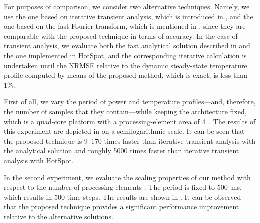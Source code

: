 For purposes of comparison, we consider two alternative techniques. Namely, we
use the one based on iterative transient analysis, which is introduced in
, and the one based on the fast Fourier transform,
which is mentioned in , since they are comparable
with the proposed technique in terms of accuracy. In the case of transient
analysis, we evaluate both the fast analytical solution described in
 and the one implemented in HotSpot, and the
corresponding iterative calculation is undertaken until the \ac{NRMSE} relative
to the dynamic steady-state temperature profile computed by means of the
proposed method, which is exact, is less than 1\%.

First of all, we vary the period \period of power and temperature
profiles---and, therefore, the number of samples \ns that they contain---while
keeping the architecture fixed, which is a quad-core platform with a
processing-element area of 4~. The results of this experiment are
depicted in  on a semilogarithmic scale.
It can be seen that the proposed technique is 9--170 times faster than iterative
transient analysis with the analytical solution and roughly 5000 times faster
than iterative transient analysis with HotSpot.

In the second experiment, we evaluate the scaling properties of our method with
respect to the number of processing elements \np. The period is fixed to 500~ms,
which results in 500 time steps. The results are shown in
. It can be observed that the proposed
technique provides a significant performance improvement relative to the
alternative solutions.
